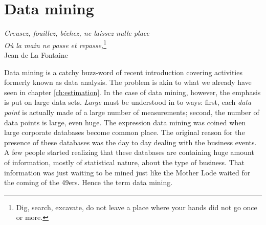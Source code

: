 \documentclass[twoside]{book}
\begin{document}
\fi

\chapter{Data mining} \vspace{1 ex}
\begin{flushright} {\sl Creusez, fouillez, b\^echez, ne laissez nulle place}\\
{\sl O\`{u} la main ne passe et repasse,}\footnote{Dig, search,
excavate, do not leave a place where your hands did not go once or
more.}\\ Jean de La Fontaine
\end{flushright}
\vspace{1 ex} \label{ch:datamining} Data mining is a catchy
buzz-word of recent introduction covering activities formerly
known as data analysis. The problem is akin to what we already
have seen in chapter \ref{ch:estimation}. In the case of data
mining, however, the emphasis is put on large data sets. {\sl
Large} must be understood in to ways: first, each {\sl data point}
is actually made of a large number of measurements; second, the
number of data points is large, even huge. The expression data
mining was coined when large corporate databases become common
place. The original reason for the presence of these databases was
the day to day dealing with the business events. A few people
started realizing that these databases are containing huge amount
of information, mostly of statistical nature, about the type of
business. That information was just waiting to be mined just like
the Mother Lode waited for the coming of the 49ers. Hence the term
data mining.
\end{document}
